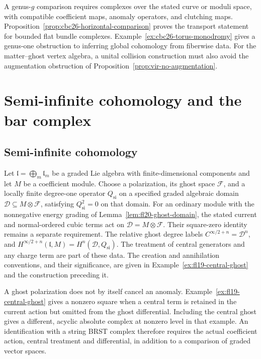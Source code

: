\begin{remark}
\label{rem:brst-bar-higher-genus}
A genus-$g$ comparison requires complexes over the stated curve or moduli space, with compatible coefficient maps, anomaly operators, and clutching maps.
Proposition~\ref{prop:cbc26-horizontal-comparison} proves the transport statement for bounded flat bundle complexes.
Example~\ref{ex:cbc26-torus-monodromy} gives a genus-one obstruction to inferring global cohomology from fiberwise data.
For the matter--ghost vertex algebra, a unital collision construction must also avoid the augmentation obstruction of Proposition~\ref{prop:vir-no-augmentation}.
\end{remark}

\section{Semi-infinite cohomology and the bar complex}
\label{sec:semi-infinite-bar}

\subsection{Semi-infinite cohomology}

\begin{definition}
\label{def:semi-infinite-cohomology}
Let $\mathfrak l=\bigoplus_m\mathfrak l_m$ be a graded Lie algebra with finite-dimensional components and let $M$ be a coefficient module.
Choose a polarization, its ghost space $\mathcal F$, and a locally finite degree-one operator $Q_{\mathrm{si}}$ on a specified graded algebraic domain $\mathcal D\subseteq M\otimes\mathcal F$, satisfying $Q_{\mathrm{si}}^2=0$ on that domain.
For an ordinary module with the nonnegative energy grading of Lemma~\ref{lem:fl20-ghost-domain}, the stated current and normal-ordered cubic terms act on $\mathcal D=M\otimes\mathcal F$.
Their square-zero identity remains a separate requirement.
The relative ghost degree labels $C^{\infty/2+n}=\mathcal D^n$, and
$H^{\infty/2+n}(\mathfrak l,M)=H^n(\mathcal D,Q_{\mathrm{si}})$.
The treatment of central generators and any charge term are part of these data.
The creation and annihilation conventions, and their significance, are given in Example~\ref{ex:fl19-central-ghost} and the construction preceding it.
\end{definition}

\begin{remark}
\label{rem:semi-infinite-vs-brst}
A ghost polarization does not by itself cancel an anomaly.
Example~\ref{ex:fl19-central-ghost} gives a nonzero square when a central term is retained in the current action but omitted from the ghost differential.
Including the central ghost gives a different, acyclic absolute complex at nonzero level in that example.
An identification with a string BRST complex therefore requires the actual coefficient action, central treatment and differential, in addition to a comparison of graded vector spaces.
\end{remark}

